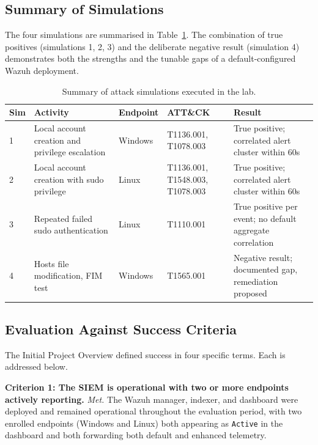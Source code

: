 \subsection{Summary of Simulations}

The four simulations are summarised in Table~\ref{tab:simsummary}. The
combination of true positives (simulations 1, 2, 3) and the deliberate
negative result (simulation 4) demonstrates both the strengths and the
tunable gaps of a default-configured Wazuh deployment.

\begin{table}[h!]
\centering
\small
\begin{tabular}{p{0.8cm} p{4.5cm} p{2cm} p{3cm} p{3.5cm}}
\toprule
\textbf{Sim} & \textbf{Activity} & \textbf{Endpoint} & \textbf{ATT\&CK} & \textbf{Result} \\
\midrule
1 & Local account creation and privilege escalation & Windows & T1136.001, T1078.003 & True positive; correlated alert cluster within 60s \\
2 & Local account creation with sudo privilege & Linux & T1136.001, T1548.003, T1078.003 & True positive; correlated alert cluster within 60s \\
3 & Repeated failed sudo authentication & Linux & T1110.001 & True positive per event; no default aggregate correlation \\
4 & Hosts file modification, FIM test & Windows & T1565.001 & Negative result; documented gap, remediation proposed \\
\bottomrule
\end{tabular}
\caption{Summary of attack simulations executed in the lab.}
\label{tab:simsummary}
\end{table}

\subsection{Evaluation Against Success Criteria}

The Initial Project Overview defined success in four specific terms. Each is
addressed below.

\textbf{Criterion 1: The SIEM is operational with two or more endpoints
actively reporting.} \textit{Met.} The Wazuh manager, indexer, and dashboard
were deployed and remained operational throughout the evaluation period,
with two enrolled endpoints (Windows and Linux) both appearing as
\texttt{Active} in the dashboard and both forwarding both default and
enhanced telemetry.

